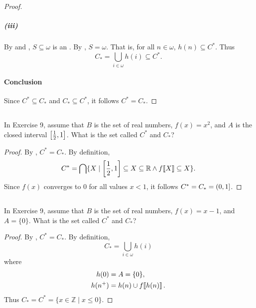 \documentclass{report}
\begin{document}
\begin{proof}
      \subparagraph{(iii)}%

        By  and ,
          $S \subseteq \omega$ is an .
        By , $S = \omega$.
        That is, for all $n \in \omega$, $h(n) \subseteq C^*$.
        Thus $$C_* = \bigcup_{i \in \omega} h(i) \subseteq C^*.$$

    \paragraph{Conclusion}%

      Since $C^* \subseteq C_*$ and $C_* \subseteq C^*$, it follows $C^* = C_*$.

  \end{proof}

\subsection{}%

  In Exercise 9, assume that $B$ is the set of real numbers, $f(x) = x^2$, and
    $A$ is the closed interval $\left[\frac{1}{2}, 1\right]$.
  What is the set called $C^*$ and $C_*$?

  \begin{proof}
    By , $C^* = C_*$.
    By definition,
      $$C^* = \bigcap \{X \mid
        \left[\frac{1}{2}, 1\right] \subseteq X \subseteq \mathbb{R} \land
        f\!\left\llbracket X\right\rrbracket \subseteq X\}.$$
    Since $f(x)$ converges to $0$ for all values $x < 1$, it follows
      $C^* = C_* = \left(0, 1\right]$.
  \end{proof}

\subsection{}%

  In Exercise 9, assume that $B$ is the set of real numbers, $f(x) = x - 1$, and
    $A = \{0\}$.
  What is the set called $C^*$ and $C_*$?

  \begin{proof}
    By , $C^* = C_*$.
    By definition, $$C_* = \bigcup_{i \in \omega} h(i)$$ where
      \begin{align*}
        h(0) & = A = \{0\}, \\
        h(n^+) & = h(n) \cup f\!\left\llbracket h(n)\right\rrbracket.
      \end{align*}
    Thus $C_* = C^* = \{x \in \mathbb{Z} \mid x \leq 0\}$.
  \end{proof}
\end{document}
